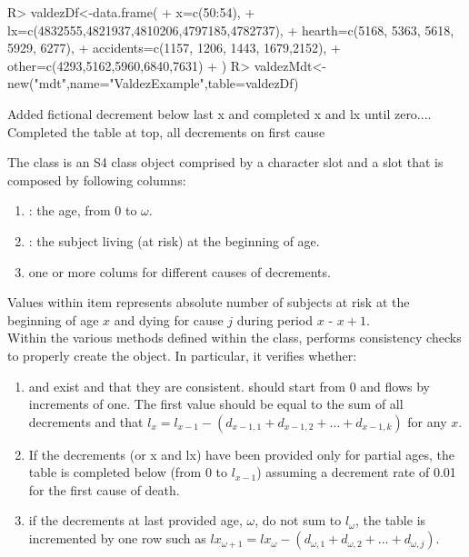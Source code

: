 \documentclass[nojss]{jss}
\begin{document}
\begin{Schunk}
\begin{Sinput}
R> valdezDf<-data.frame(
+  		x=c(50:54),
+  		lx=c(4832555,4821937,4810206,4797185,4782737),
+  		hearth=c(5168, 5363, 5618, 5929, 6277),
+  		accidents=c(1157, 1206, 1443, 1679,2152),
+  		other=c(4293,5162,5960,6840,7631)
+  )
R> valdezMdt<-new("mdt",name="ValdezExample",table=valdezDf)
\end{Sinput}
\begin{Soutput}
Added fictional decrement below last x and completed x and lx until zero.... 
Completed the table at top, all decrements on first cause 
\end{Soutput}
\end{Schunk}

The  class is an S4 class object \citep{chambers2008software}
comprised by a character slot  and a  slot
 that is composed by following columns:
\begin{enumerate}
  \item {}: the age, from 0 to $\omega$.
  \item {}: the subject living (at risk) at the beginning of age.
  \item one or more colums for different causes of decrements.
 \end{enumerate}
 
 Values within  item represents absolute number of subjects at risk at the beginning of age $x$ and dying for cause $j$ during period $x$ - $x+1$.\\

Within the various methods defined within the  class,
 performs consistency checks to properly create the 
object. In particular, it verifies whether:
\begin{enumerate}
  \item {} and  exist and that they are consistent. 
  should start from 0 and flows by increments of one. The first  value should be
  equal to the sum of all decrements and that $l_{x}=l_{x-1}-\left( d_{x-1,1} +
  d_{x-1,2} + \ldots + d_{x-1,k} \right)$ for any $x$.
  \item If the decrements (or x and lx) have been provided only for partial
  ages, the table is completed below (from 0 to $l_{x-1}$) assuming a decrement
  rate of 0.01 for the first cause of death.
  \item if the decrements at last provided age, $\omega$, do not sum to
  $l_{\omega}$, the table is incremented by one row such as $lx_{\omega+1}=lx_{\omega}-\left( d_{\omega,1} + d_{\omega,2} + 
  \ldots + d_{\omega,j} \right)$.
 \end{enumerate}
\end{document}
